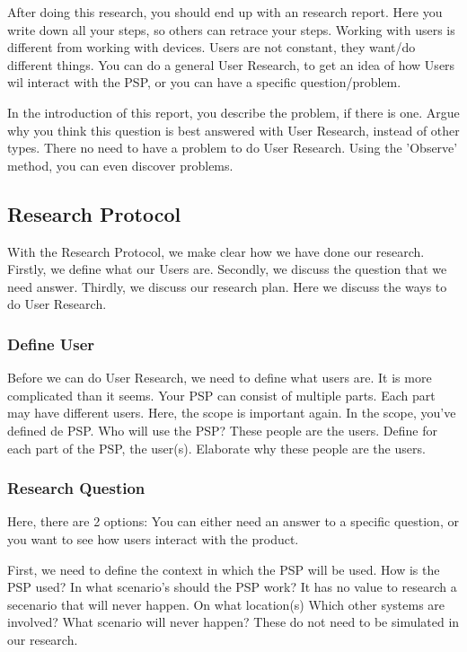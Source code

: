 \documentclass[10pt]{report}
\begin{document}
After doing this research, you should end up with an research report. Here you write down all your steps, so others can retrace your steps. Working with users is different from working with devices. Users are not constant, they want/do different things. You can do a general User Research, to get an idea of how Users wil interact with the PSP, or you can have a specific question/problem.

In the introduction of this report, you describe the problem, if there is one. Argue why you think this question is best answered with User Research, instead of other types. There no need to have a problem to do User Research. Using the 'Observe' method, you can even discover problems.

\subsection{Research Protocol}

With the Research Protocol, we make clear how we have done our research. Firstly, we define what our Users are. Secondly, we discuss the question that we need answer. Thirdly, we discuss our research plan. Here we discuss the ways to do User Research.

\subsubsection{Define User}

Before we can do User Research, we need to define what users are. It is more complicated than it seems. Your PSP can consist of multiple parts. Each part may have different users. Here, the scope is important again. In the scope, you've defined de PSP. Who will use the PSP? These people are the users. Define for each part of the PSP, the user(s). Elaborate why these people are the users.

\subsubsection{Research Question}

Here, there are 2 options: You can either need an answer to a specific question, or you want to see how users interact with the product.

First, we need to define the context in which the PSP will be used. How is the PSP used? In what scenario's should the PSP work? It has no value to research a secenario that will never happen. On what location(s) Which other systems are involved? What scenario will never happen? These do not need to be simulated in our research.
\end{document}
